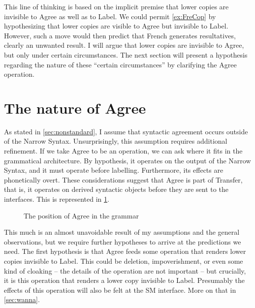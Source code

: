 \documentclass[MilwayThesis]{subfiles}
\begin{document}
This line of thinking is based on the implicit premise that lower copies are invisible to Agree as well as to Label.
We could permit \cref{ex:FreCop} by hypothesizing that lower copies are visible to Agree but invisible to Label.
However, such a move would then predict that French generates resultatives, clearly an unwanted result.
I will argue that lower copies are invisible to Agree, but only under certain circumstances.
The next section will present a hypothesis regarding the nature of these ``certain circumstances'' by clarifying the Agree operation.

\section{The nature of Agree}\label{sec:natureofagree}

As stated in \cref{sec:nonstandard}, I assume that syntactic agreement occurs outside of the Narrow Syntax.
Unsurprisingly, this assumption requires additional refinement.
If we take Agree to be an operation, we can ask where it fits in the grammatical architecture.
By hypothesis, it operates on the output of the Narrow Syntax, and it must operate before labelling.
Furthermore, its effects are phonetically overt.
These considerations suggest that Agree is part of Transfer, that is, it operates on derived syntactic objects before they are sent to the interfaces.
This is represented in \cref{fig:SepCycles}.
\begin{figure}[h]
  \centering
  \caption{The position of Agree in the grammar}
  \label{fig:SepCycles}
\end{figure}

This much is an almost unavoidable result of my assumptions and the general observations, but we require further hypotheses to arrive at the predictions we need.
The first hypothesis is that Agree feeds some operation that renders lower copies invisible to Label.
This could be deletion, impoverishment, or even some kind of cloaking -- the details of the operation are not important -- but crucially, it is this operation that renders a lower copy invisible to Label.
Presumably the effects of this operation will also be felt at the SM interface.
More on that in \cref{sec:wanna}.
\end{document}
